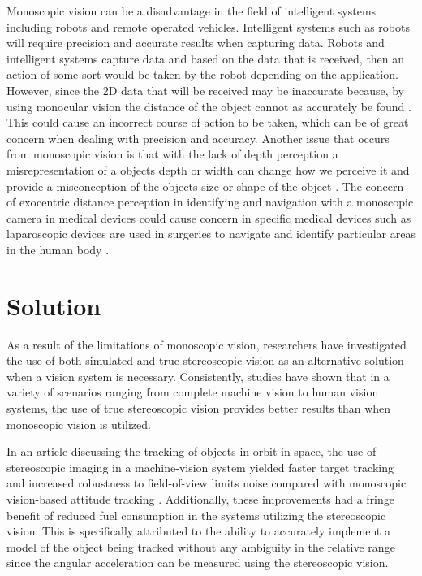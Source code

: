 \documentclass[12pt, journal]{IEEEtran}
\begin{document}
Monoscopic vision can be a disadvantage in the field of intelligent systems including robots and remote operated vehicles. Intelligent systems such as robots will require precision and accurate results when capturing data. Robots and intelligent systems capture data and based on the data that is received, then an action of some sort would be taken by the robot depending on the application. However, since the 2D data that will be received may be inaccurate because, by using monocular vision the distance of the object cannot as accurately be found \cite{segal}. This could cause an incorrect course of action to be taken, which can be of great concern when dealing with precision and accuracy. Another issue that occurs from monoscopic vision is that with the lack of depth perception a misrepresentation of a objects depth or width can change how we perceive it and provide a misconception of the objects size or shape of the object \cite{pollock}. The concern of exocentric distance perception in identifying and navigation with a monoscopic camera in medical devices could cause concern in specific medical devices such as laparoscopic devices are used in surgeries to navigate and identify particular areas in the human body \cite{pollock}. 

\section{Solution}
As a result of the limitations of monoscopic vision, researchers have investigated the use of both simulated and true stereoscopic vision as an alternative solution when a vision system is necessary.  Consistently, studies have shown that in a variety of scenarios ranging from complete machine vision to human vision systems, the use of true stereoscopic vision provides better results than when monoscopic vision is utilized.

In an article discussing the tracking of objects in orbit in space, the use of stereoscopic imaging in a machine-vision system yielded faster target tracking and increased robustness to field-of-view limits noise compared with monoscopic vision-based attitude tracking \cite{segal}. Additionally, these improvements had a fringe benefit of reduced fuel consumption in the systems utilizing the stereoscopic vision.  This is specifically attributed to the ability to accurately implement a model of the object being tracked without any ambiguity in the relative range since the angular acceleration can be measured using the stereoscopic vision.
\end{document}
